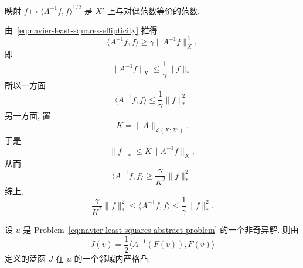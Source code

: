 \setcounter{statement}{0}
\begin{Lemma}
\label{lem:navier-least-squares-equivalent-dual-norm}
映射 $f\mapsto\langle A^{-1}f,f\rangle^{1/2}$ 是 $X'$ 上与对偶范数等价的范数.
\end{Lemma}

\begin{Proof}
由 \,\eqref{eq:navier-least-squares-ellipticity} 推得
\[
\langle A^{-1}f,f\rangle\geq\gamma\|A^{-1}f\|_X^2,
\]
即
\[
\|A^{-1}f\|_X\leq\frac1\gamma\|f\|_*.
\]
所以一方面
\[
\langle A^{-1}f,f\rangle\leq\frac1\gamma\|f\|_*^2.
\]
另一方面, 置
\[
K=\|A\|_{\mathcal L(X;X')}.
\]
于是
\[
\|f\|_*\leq K\|A^{-1}f\|_X,
\]
从而
\[
\langle A^{-1}f,f\rangle\geq\frac\gamma{K^2}\|f\|_*^2.
\]
综上,
\begin{equation}
\label{eq:navier-least-squares-norm-equivalence}
\frac\gamma{K^2}\|f\|_*^2
\leq\langle A^{-1}f,f\rangle
\leq\frac1\gamma\|f\|_*^2.
\end{equation}
\end{Proof}

\setcounter{statement}{2}
\begin{Theorem}
\label{thm:navier-least-squares-local-convexity}
设 $u$ 是 Problem~\eqref{eq:navier-least-squares-abstract-problem} 的一个非奇异解.
则由
\begin{equation}
\label{eq:navier-least-squares-functional}
J(v)=\frac12\langle A^{-1}(F(v)),F(v)\rangle
\end{equation}
定义的泛函 $J$ 在 $u$ 的一个邻域内严格凸.
\end{Theorem}

